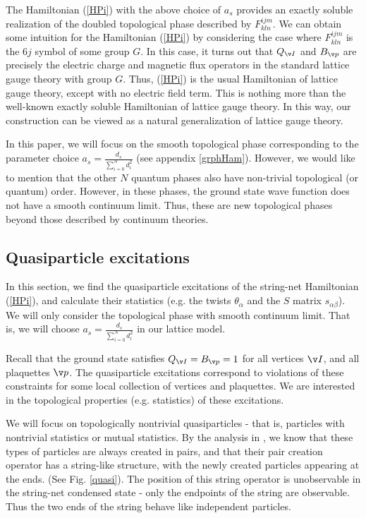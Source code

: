 \documentclass[aps,twocolumn,groupedaddress,showpacs,floatfix]{revtex4}
\begin{document}
The Hamiltonian (\ref{HPi}) with the above choice of $a_s$ provides an exactly
soluble realization of the doubled topological phase described by
$F^{ijm}_{kln}$. We can obtain some intuition for the Hamiltonian
(\ref{HPi}) by considering
the case where $F^{ijm}_{kln}$ is the $6j$ symbol of some group $G$. In this
case, it turns out that $Q_{\v I}$ and $B_{\v p}$ are precisely the
electric charge and magnetic flux operators in the standard lattice
gauge theory with group $G$. Thus, (\ref{HPi}) is the usual Hamiltonian of
lattice gauge theory, except with no electric field term. This is nothing
more than the well-known exactly soluble Hamiltonian of lattice gauge theory.
\cite{W7159,K032} In this way, our construction can be viewed as a natural
generalization of lattice gauge theory.

In this paper, we will focus on the smooth topological phase corresponding to
the parameter choice $a_s=\frac{d_s}{\sum_{i=0}^N d_i^2}$ (see appendix
\ref{grphHam}). However, we would like to mention that the other $N$ quantum
phases also have non-trivial topological (or quantum) order. However, in these
phases, the ground state wave function does not have a smooth continuum limit.
Thus, these are new topological phases beyond those described by continuum
theories. 

\subsection{Quasiparticle excitations}

In this section, we find the quasiparticle
excitations of the string-net Hamiltonian (\ref{HPi}), and calculate their
statistics (e.g. the twists $\theta_{\alpha}$ and the $S$ matrix 
$s_{\alpha\beta}$). We will only consider the topological phase with smooth 
continuum limit. That is, we will choose $a_s=\frac{d_s}{\sum_{i=0}^N d_i^2}$ 
in our lattice model.

Recall that the ground state satisfies $Q_{\v I} = B_{\v p} = 1$ for all
vertices $\v I$, and all plaquettes $\v p$. The quasiparticle excitations 
correspond to violations of these constraints for some local collection of 
vertices and plaquettes. We are interested in the topological properties
(e.g. statistics) of these excitations.

We will focus on topologically nontrivial quasiparticles - that is, particles
with nontrivial statistics or mutual statistics. By the analysis in 
, we know that these types of particles are always created in 
pairs, and that their pair creation operator has a string-like structure, with 
the newly created particles appearing at the ends. (See Fig. \ref{quasi}). 
The position of this string operator is unobservable in the string-net 
condensed state - only the endpoints of the string are observable. Thus the 
two ends of the string behave like independent particles.  
\end{document}
